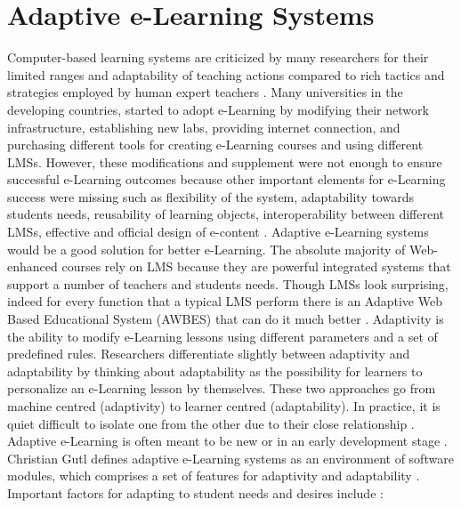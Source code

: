 \documentclass[12pt,a4paper,final,twoside,onecolumn,titlepage]{book}
\begin{document}
\section{Adaptive e-Learning Systems}
Computer-based learning systems are criticized by many researchers for their limited ranges and adaptability of teaching actions compared to rich tactics and strategies employed by human expert teachers \cite{R10}. Many universities in the developing countries, started to adopt e-Learning by modifying their network infrastructure, establishing new labs, providing internet connection, and purchasing different tools for creating e-Learning courses and using different \gls{LMS}s. However, these modifications and supplement were not enough to ensure successful e-Learning outcomes because other important elements for e-Learning success were missing such as flexibility of the system, adaptability towards students needs, reusability of learning objects, interoperability between different \gls{LMS}s, effective and official design of e-content \cite{R11}.
Adaptive e-Learning systems would be a good solution for better e-Learning. The absolute majority of Web-enhanced courses rely on \gls{LMS} because they are powerful integrated systems that support a number of teachers and students needs. Though \gls{LMS}s look surprising, indeed for every function that a typical \gls{LMS} perform there is an Adaptive Web Based Educational System (AWBES) that can do it much better \cite{R12}. Adaptivity is the ability to modify e-Learning lessons using different parameters and a set of predefined rules. Researchers differentiate slightly between adaptivity and adaptability by thinking about adaptability as the possibility for learners to personalize an e-Learning lesson by themselves. These two approaches go from machine centred (adaptivity) to learner centred (adaptability). In practice, it is quiet difficult to isolate one from the other due to their close relationship \cite{R13,R14}. Adaptive e-Learning is often meant to be new or in an early development stage \cite{R10}. Christian Gutl defines adaptive e-Learning systems as an environment of software modules, which comprises a set of features for adaptivity and adaptability \cite{R15}. Important factors for adapting to student needs and desires include \cite{R07}:
\end{document}
